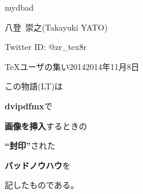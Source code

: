 %
%
\begin{mybgcolor}{mydbad}

\begin{myframe}\color{white}%
  \begin{mycenter}
    {{\large 八登\ 崇之}\quad(Takayuki YATO)}\par
    \smallskip
    {{\small Twitter ID:}\quad
      \textcolor{yellow!75!white}{@zr\_tex8r}}\par
    \smallskip
    {\small{\TeX}ユーザの集い2014\qquad 2014年11月8日}
  \end{mycenter}
\end{myframe}

\newcommand*{\myemph}[1]{\textcolor{mylbad}{\bfseries #1}}
\begin{myframe}\color{white}
  \begin{mycenter}\large
  \begin{minipage}{15em}
  この物語{\small (LT)}は
  \par{}\hspace*{1em}
  \myemph{dvipdfmx}で
  \par{}\hspace*{2em}
  \myemph{画像を挿入}するときの
  \par{}\hspace*{3em}
  {\LARGE\bfseries\textcolor{mybanned!50!white}{“封印”}}\:された
  \par{}\hspace*{4em}
  \myemph{バッドノウハウ}を
  \par{}\hspace*{5em}
  記したものである。
  \end{minipage}\end{mycenter}
\end{myframe}

\end{mybgcolor}

